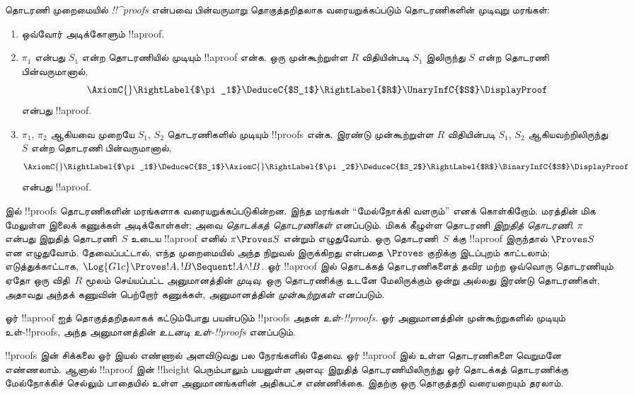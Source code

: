 \documentclass[../../../include/open-logic-section]{subfiles}
\begin{document}
\begin{defn}
தொடரணி முறைமையில் \emph{!!^{proof}s} என்பவை பின்வருமாறு
தொகுத்தறிதலாக வரையறுக்கப்படும் தொடரணிகளின்
முடிவுறு மரங்கள்:
\begin{enumerate}
  \item{} ஒவ்வோர் அடிக்கோளும்
  !!a{proof}.
  \item{} $\pi_1$ என்பது
  $S_1$ என்ற தொடரணியில் முடியும் !!a{proof} என்க.
  ஒரு முன்கூற்றுள்ள $R$ விதியின்படி $S_1$ இலிருந்து
  $S$ என்ற தொடரணி பின்வருமானால்,
  \[
  \AxiomC{}
  \RightLabel{$\pi_1$}
  \DeduceC{$S_1$}
  \RightLabel{$R$}
  \UnaryInfC{$S$}
  \DisplayProof
  \]
  என்பது !!a{proof}.
  \item{} $\pi_1$, $\pi_2$
  ஆகியவை முறையே $S_1$, $S_2$ தொடரணிகளில்
  முடியும் !!{proof}s என்க. இரண்டு முன்கூற்றுள்ள
  $R$ விதியின்படி $S_1$, $S_2$ ஆகியவற்றிலிருந்து
  $S$ என்ற தொடரணி பின்வருமானால்,
  \[
  \AxiomC{}
  \RightLabel{$\pi_1$}
  \DeduceC{$S_1$}
  \AxiomC{}
  \RightLabel{$\pi_2$}
  \DeduceC{$S_2$}
  \RightLabel{$R$}
  \BinaryInfC{$S$}
  \DisplayProof
  \]
  என்பது !!a{proof}.
\end{enumerate}
\end{defn}

 இல் !!{proof}s தொடரணிகளின்
மரங்களாக வரையறுக்கப்படுகின்றன. இந்த மரங்கள்
``மேல்நோக்கி வளரும்'' எனக் கொள்கிறோம். மரத்தின்
மிக மேலுள்ள இலைக் கணுக்கள் அடிக்கோள்கள்;
அவை \emph{தொடக்கத் தொடரணிகள்} எனப்படும். மிகக்
கீழுள்ள தொடரணி \emph{இறுதித் தொடரணி}. $\pi$
என்பது இறுதித் தொடரணி~$S$ உடைய !!a{proof}
எனில் $\pi \Proves S$ என்றும் எழுதுவோம். ஒரு
தொடரணி~$S$ க்கு !!a{proof} இருந்தால் $\Proves S$
என எழுதுவோம். தேவைப்பட்டால், எந்த முறைமையில்
அந்த நிறுவல் இருக்கிறது என்பதை $\Proves$ குறிக்கு
இடப்புறம் காட்டலாம்; எடுத்துக்காட்டாக,
$\Log{G1c} \Proves !A, !B \Sequent !A \land
!B$. ஓர் !!a{proof} இல் தொடக்கத் தொடரணிகளைத்
தவிர மற்ற ஒவ்வொரு தொடரணியும் ஏதோ ஒரு
விதி~$R$ மூலம் செய்யப்பட்ட அனுமானத்தின்
\emph{முடிவு}. ஒரு தொடரணிக்கு உடனே மேலிருக்கும்
ஒன்று அல்லது இரண்டு தொடரணிகள், அதாவது அந்தக்
கணுவின் பெற்றோர் கணுக்கள், அனுமானத்தின்
\emph{முன்கூற்றுகள்} எனப்படும்.

ஓர் !!a{proof} ஐத் தொகுத்தறிதலாகக் கட்டும்போது
பயன்படும் !!{proof}s அதன் \emph{உள்-!!{proof}s}.
ஓர் அனுமானத்தின் முன்கூற்றுகளில் முடியும்
உள்-!!{proof}s, அந்த அனுமானத்தின்
\emph{உடனடி உள்-!!{proof}s} எனப்படும்.

!!{proof}s இன் சிக்கலை ஓர் இயல் எண்ணால்
அளவிடுவது பல நேரங்களில் தேவை. ஓர் !!a{proof} இல்
உள்ள தொடரணிகளை வெறுமனே எண்ணலாம்.
ஆனால் !!a{proof} இன் !!{height} பெரும்பாலும்
பயனுள்ள அளவு: இறுதித் தொடரணியிலிருந்து ஓர்
தொடக்கத் தொடரணிக்கு மேல்நோக்கிச் செல்லும்
பாதையில் உள்ள அனுமானங்களின் அதிகபட்ச எண்ணிக்கை.
இதற்கு ஒரு தொகுத்தறி வரையறையும் தரலாம்.
\end{document}
